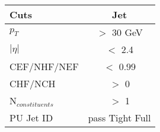 \documentclass[landscape]{article}
\begin{document}
\begin{small}
\begin{center}
    \vspace {10 mm}

    \begin{tabular}{ | l | c | }
      \hline \hline
      Cuts & Jet \\ \hline
      $p_{T}$ & $>$ 30 GeV \\ \hline
      $|\eta|$ & $<$ 2.4 \\ \hline
      CEF/NHF/NEF & $<$ 0.99 \\ \hline
      CHF/NCH & $>$ 0 \\ \hline
      N$_{constituents}$ & $>$ 1 \\ \hline
      PU Jet ID & pass Tight Full \\
      \hline \hline
    \end{tabular}

    \vspace{10 mm}


\end{center}
\end{small}
\end{document}
